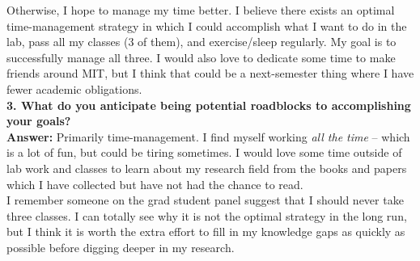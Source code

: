 \documentclass{article}
\theoremstyle{definition}
\begin{document}
\noindent Otherwise, I hope to manage my time better. I believe there exists an optimal time-management strategy in which I could accomplish what I want to do in the lab, pass all my classes (3 of them), and exercise/sleep regularly. My goal is to successfully manage all three. I would also love to dedicate some time to make friends around MIT, but I think that could be a next-semester thing where I have fewer academic obligations.\\


\noindent \textbf{3. What do you anticipate being potential roadblocks to accomplishing your goals?}\\


\noindent \textbf{Answer:} Primarily time-management. I find myself working \textit{all the time} -- which is a lot of fun, but could be tiring sometimes. I would love some time outside of lab work and classes to learn about my research field from the books and papers which I have collected but have not had the chance to read. \\

\noindent I remember someone on the grad student panel suggest that I should never take three classes. I can totally see why it is not the optimal strategy in the long run, but I think it is worth the extra effort to fill in my knowledge gaps as quickly as possible before digging deeper in my research.  
\end{document}
